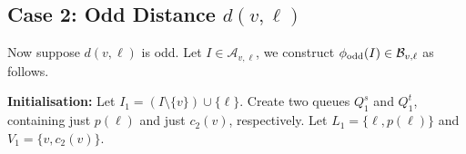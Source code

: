 \documentclass[11pt]{article}
\theoremstyle{definition}
\begin{document}

\subsection{Case 2: Odd Distance $d(v,\ell)$}\label{sec:odd}
Now suppose $d(v,\ell)$ is odd. Let $I \in \mathcal{A}_{v,\ell}$, we construct $\phi_{\textup{odd}}(I)\in\mathcal{B}_{v,\ell}$ as follows. 

\medskip

\noindent\textbf{Initialisation:} Let $I_1=(I\setminus\{v\})\cup\{\ell\}$. Create two queues $Q_1^s$ and $Q_1^t$, containing just $p(\ell)$ and just $c_2(v)$, respectively. Let $L_1=\{\ell,p(\ell)\}$ and $V_1=\{v,c_2(v)\}$.

\medskip
\end{document}
